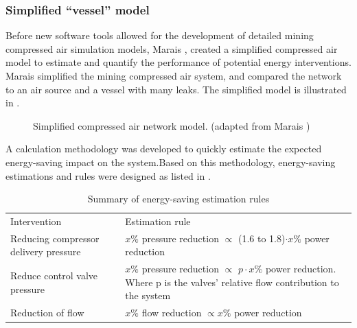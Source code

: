 		\subsubsection{Simplified \enquote{vessel} model}
		Before new software tools allowed for the development of detailed mining compressed air simulation models, Marais \cite{Marais2012PhD}, \cite{marais2013simplification} created a simplified compressed air model to estimate and quantify the performance of potential energy interventions. Marais simplified the mining compressed air system, and compared the network to an air source and a vessel with many leaks. The simplified model is illustrated in .
		\begin{figure}[h!]
			\centering
			\caption[Simplified compressed air network model]{Simplified compressed air network model. (adapted from Marais \cite{Marais2012PhD})}
			\label{fig:Marais vessel model}
		\end{figure}
		\par 
		A calculation methodology was developed to quickly estimate the expected energy-saving impact on the system.Based on this methodology, energy-saving estimations and rules were designed as listed in . \\
		\par 
		\begin{table}[h]
			\caption[Summary of energy-saving estimation rules]{Summary of energy-saving estimation rules \cite{Marais2012PhD}}
			\centering
			\begin{tabular}{p{}p{}p{}}
				\hline
				Intervention && Estimation rule\\
				\hhline{===} 
				Reducing compressor delivery pressure & & $x \%$ pressure reduction $\propto$ (1.6 to 1.8)$\cdot x\%$ power reduction \newline \\
				Reduce control valve pressure & &$x \%$ pressure reduction $\propto$ $p\cdot x\%$ power reduction. \newline \newline Where p is the valves' relative flow contribution to the system \newline \\
				Reduction of flow && $x \%$ flow reduction $\propto x \%$ power reduction \newline\\
				\hline
			\end{tabular} 
			\label{table: Rules of thumb}
		\end{table}
